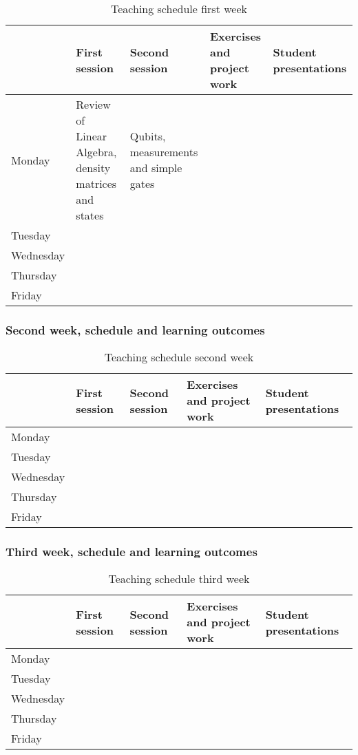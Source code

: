 \documentclass[superscriptaddress,amsmath,amssymb,aps,floatfix]{revtex4-2}
\begin{document}
\begin{table}[hbtp]
\begin{tabular}{|l|l|l|l|l|} \hline
    & First session  & Second session  & Exercises and project work & Student presentations \\ \hline
  Monday & Review of Linear Algebra, density matrices and states & Qubits, measurements and simple gates & & \\
  Tuesday & & & & \\
  Wednesday & & & & \\
  Thursday & & & & \\
  Friday & & & & \\ \hline
\end{tabular}
\caption{Teaching schedule first week}
\end{table}


\subsubsection{Second week, schedule and learning outcomes}


\begin{table}[hbtp]
\begin{tabular}{|l|l|l|l|l|} \hline
    & First session  & Second session  & Exercises and project work & Student presentations \\ \hline
  Monday & & & & \\
  Tuesday & & & & \\
  Wednesday & & & & \\
  Thursday & & & & \\
  Friday & & & & \\ \hline
\end{tabular}
\caption{Teaching schedule second  week}
\end{table}


\subsubsection{Third week, schedule and learning outcomes}


\begin{table}[hbtp]
\begin{tabular}{|l|l|l|l|l|} \hline
    & First session  & Second session  & Exercises and project work & Student presentations \\ \hline
  Monday & & & & \\
  Tuesday & & & & \\
  Wednesday & & & & \\
  Thursday & & & & \\
  Friday & & & & \\ \hline
\end{tabular}
\caption{Teaching schedule third  week}
\end{table}
\end{document}
